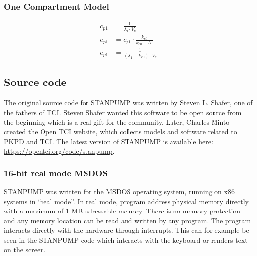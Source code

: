 \documentclass[
  letterpaper,
  DIV=11,
  numbers=noendperiod]{scrartcl}
\begin{document}
\subsubsection{One Compartment Model}\label{one-compartment-model}

\[
\begin{equation}
\begin{aligned}
c_{p1} & = \frac{1}{\lambda_1 \cdot V_c}
\\
e_{p1} & = c_{p1} \cdot \frac{k_{e0}}{k_{e0} - \lambda_1}
\\
e_{p1} & = \frac{1}{(\lambda_1 - k_{e0}) \cdot V_c}
\end{aligned}
\end{equation}
\]

\subsection{Source code}\label{source-code}

The original source code for STANPUMP was written by Steven L. Shafer,
one of the fathers of TCI. Steven Shafer wanted this software to be open
source from the beginning which is a real gift for the community. Later,
Charles Minto created the Open TCI website, which collects models and
software related to PKPD and TCI. The latest version of STANPUMP is
available here: \url{https://opentci.org/code/stanpump}.

\subsubsection{16-bit real mode MSDOS}\label{bit-real-mode-msdos}

STANPUMP was written for the MSDOS operating system, running on x86
systems in ``real mode''. In real mode, program address physical memory
directly with a maximum of 1 MB adressable memory. There is no memory
protection and any memory location can be read and written by any
program. The program interacts directly with the hardware through
interrupts. This can for example be seen in the STANPUMP code which
interacts with the keyboard or renders text on the screen.
\end{document}
